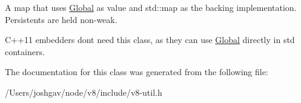 A map that uses \hyperlink{classv8_1_1_global}{Global} as value and std\+::map as the backing implementation. Persistents are held non-\/weak.

C++11 embedders don\textquotesingle{}t need this class, as they can use \hyperlink{classv8_1_1_global}{Global} directly in std containers. 

The documentation for this class was generated from the following file\+:\begin{DoxyCompactItemize}
\item 
/\+Users/joshgav/node/v8/include/v8-\/util.\+h\end{DoxyCompactItemize}
